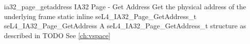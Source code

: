 %
%
%
%

\apidoc
{ia32_page_getaddress}
{IA32 Page - Get Address}
{Get the physical address of the underlying frame}
{static inline seL4\_IA32\_Page\_GetAddress\_t seL4\_IA32\_Page\_GetAddress}
{
}
{A seL4\_IA32\_Page\_GetAddress\_t structure as described in TODO}
{See \autoref{ch:vspace}}
